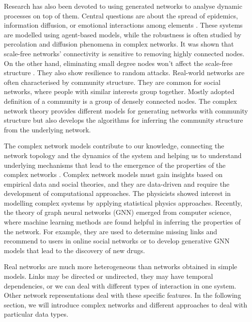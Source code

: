 Research has also been devoted to using generated networks to analyse dynamic processes on top of them. Central questions are about the spread of epidemics, information diffusion, or emotional interactions among elements \cite{garas2012emotional}. These systems are modelled using agent-based models, while the robustness is often studied by percolation and diffusion phenomena in complex networks. It was shown that scale-free networks' connectivity is sensitive to removing highly connected nodes. On the other hand, eliminating small degree nodes won't affect the scale-free structure \cite{cohen2000resilience}. They also show resilience to random attacks. Real-world networks are often characterised by community structure. They are common for social networks, where people with similar interests group together. Mostly adopted definition of a community is a group of densely connected nodes. The complex network theory provides different models for generating networks with community structure but also develops the algorithms for inferring the community structure from the underlying network. 

The complex network models contribute to our knowledge, connecting the network topology and the dynamics of the system and helping us to understand underlying mechanisms that lead to the emergence of the properties of the complex networks \cite{barabasi1999, tadic2001, mitrovic2009, ghoshal2013uncovering}. %
Complex network models must gain insights based on empirical data and social theories, and they are data-driven and require the development of computational approaches. The physicists showed interest in modelling complex systems by applying statistical physics approaches. Recently, the theory of graph neural networks (GNN) emerged from computer science, where machine learning methods are found helpful in inferring the properties of the network. For example, they are used to determine missing links and recommend to users in online social networks or to develop generative GNN models that lead to the discovery of new drugs.  

Real networks are much more heterogeneous than networks obtained in simple models. Links may be directed or undirected, they may have temporal dependencies, or we can deal with different types of interaction in one system. Other network representations deal with these specific features. In the following section, we will introduce complex networks and different approaches to deal with particular data types. 

